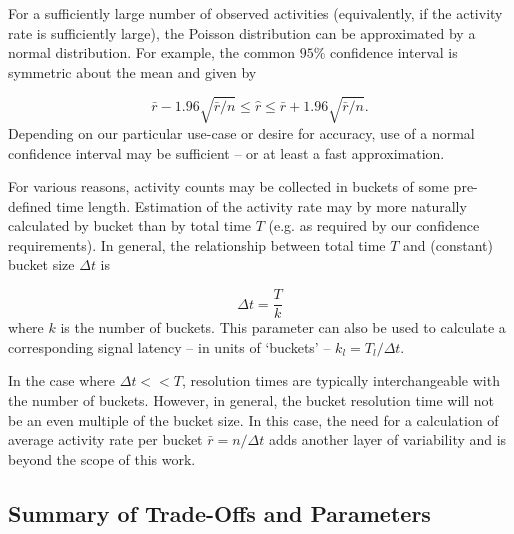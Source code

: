 \documentclass{article}
\begin{document}

For a sufficiently large number of observed activities (equivalently, if the activity rate is sufficiently 
large), the Poisson distribution can be approximated by a normal distribution. For example, 
the common $95\%$ confidence interval is symmetric about the mean and given by

\begin{equation}
    \label{eq:largenconf}
    \bar{r} - 1.96 \sqrt{\bar{r}/n} \leq \hat{r} \leq \bar{r} + 1.96 \sqrt{\bar{r}/n}.
\end{equation}
Depending on our particular use-case or desire for accuracy, use of a normal confidence interval 
may be sufficient -- or at least a fast approximation.


For various reasons, activity counts may be collected in buckets of some pre-defined time length.  
Estimation of the activity rate may by more naturally calculated by bucket than by total time $T$ 
(e.g. as required by our confidence requirements). In general, the relationship between total time 
$T$ and (constant) bucket size $\Delta t$ is 

\begin{equation}
    \label{eq:bucket}
    \Delta t = \frac{T}{k}
\end{equation}
where $k$ is the number of buckets. This parameter can also be used to calculate a corresponding 
signal latency -- in units of `buckets' -- $k_l = T_l/\Delta t$.

In the case where $\Delta t << T$, resolution times are typically interchangeable with the number 
of buckets. However, in general, the bucket resolution time will not be an even multiple of the 
bucket size. In this case, the need for a calculation of average activity rate per bucket 
$\bar{r} = n/\Delta t$ adds another layer of variability and is beyond the scope of this 
work. 


\subsection{Summary of Trade-Offs and Parameters}
\label{tradoffs}
\end{document}
